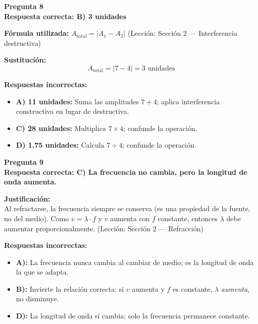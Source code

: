 \begin{respuestabox}
\textbf{Pregunta 8}\\
\textcolor{verdecorrecto}{\textbf{Respuesta correcta: B) 3 unidades}}

\textbf{Fórmula utilizada:} $A_{\text{total}} = |A_1 - A_2|$ (Lección: Sección 2 — Interferencia destructiva)

\textbf{Sustitución:}
$$A_{\text{total}} = |7 - 4| = 3 \text{ unidades}$$

\textbf{Respuestas incorrectas:}
\begin{itemize}
    \item \textbf{A) 11 unidades:} Suma las amplitudes $7 + 4$; aplica interferencia constructiva en lugar de destructiva.
    \item \textbf{C) 28 unidades:} Multiplica $7 \times 4$; confunde la operación.
    \item \textbf{D) 1.75 unidades:} Calcula $7 \div 4$; confunde la operación.
\end{itemize}
\end{respuestabox}

\begin{respuestabox}
\textbf{Pregunta 9}\\
\textcolor{verdecorrecto}{\textbf{Respuesta correcta: C) La frecuencia no cambia, pero la longitud de onda aumenta.}}

\textbf{Justificación:}\\
Al refractarse, la frecuencia siempre se conserva (es una propiedad de la fuente, no del medio). Como $v = \lambda \cdot f$ y $v$ aumenta con $f$ constante, entonces $\lambda$ debe aumentar proporcionalmente. (Lección: Sección 2 — Refracción)

\textbf{Respuestas incorrectas:}
\begin{itemize}
    \item \textbf{A):} La frecuencia nunca cambia al cambiar de medio; es la longitud de onda la que se adapta.
    \item \textbf{B):} Invierte la relación correcta: si $v$ aumenta y $f$ es constante, $\lambda$ \textit{aumenta}, no disminuye.
    \item \textbf{D):} La longitud de onda sí cambia; solo la frecuencia permanece constante.
\end{itemize}
\end{respuestabox}


